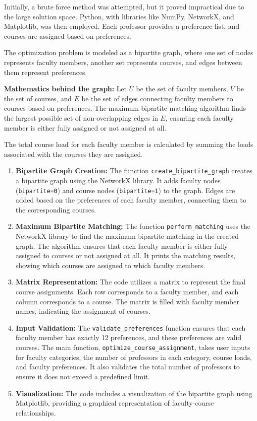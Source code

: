 \documentclass[twoside]{article}
\begin{document}
Initially, a brute force method was attempted, but it proved impractical due to the large solution space. Python, with libraries like NumPy, NetworkX, and Matplotlib, was then employed. Each professor provides a preference list, and courses are assigned based on preferences.

The optimization problem is modeled as a bipartite graph, where one set of nodes represents faculty members, another set represents courses, and edges between them represent preferences.

\textbf{Mathematics behind the graph:} Let \(U\) be the set of faculty members, \(V\) be the set of courses, and \(E\) be the set of edges connecting faculty members to courses based on preferences. The maximum bipartite matching algorithm finds the largest possible set of non-overlapping edges in \(E\), ensuring each faculty member is either fully assigned or not assigned at all.

The total course load for each faculty member is calculated by summing the loads associated with the courses they are assigned.

\begin{enumerate}[label= \arabic*.]
    \item \textbf{Bipartite Graph Creation:} The function \texttt{create\_bipartite\_graph} creates a bipartite graph using the NetworkX library. It adds faculty nodes (\texttt{bipartite=0}) and course nodes (\texttt{bipartite=1}) to the graph. Edges are added based on the preferences of each faculty member, connecting them to the corresponding courses.
    \item \textbf{Maximum Bipartite Matching:} The function \texttt{perform\_matching} uses the NetworkX library to find the maximum bipartite matching in the created graph. The algorithm ensures that each faculty member is either fully assigned to courses or not assigned at all. It prints the matching results, showing which courses are assigned to which faculty members.
    \item \textbf{Matrix Representation:} The code utilizes a matrix to represent the final course assignments. Each row corresponds to a faculty member, and each column corresponds to a course. The matrix is filled with faculty member names, indicating the assignment of courses.
    \item \textbf{Input Validation:} The \texttt{validate\_preferences} function ensures that each faculty member has exactly 12 preferences, and these preferences are valid courses. The main function, \texttt{optimize\_course\_assignment}, takes user inputs for faculty categories, the number of professors in each category, course loads, and faculty preferences. It also validates the total number of professors to ensure it does not exceed a predefined limit.
    \item \textbf{Visualization:} The code includes a visualization of the bipartite graph using Matplotlib, providing a graphical representation of faculty-course relationships.
\end{enumerate}
\end{document}
